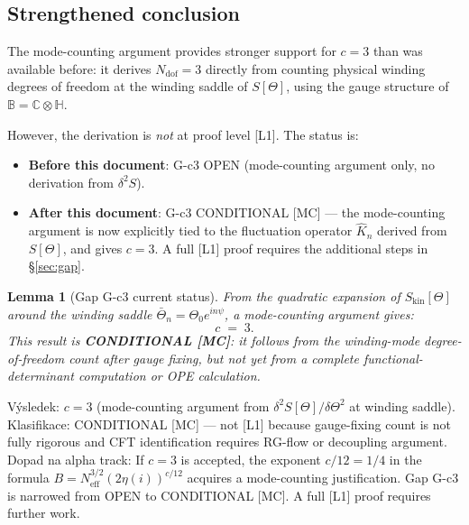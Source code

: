 \documentclass[12pt,a4paper]{article}
\newtheorem{lemma}[theorem]{Lemma}
\theoremstyle{remark}
\newcommand{\BB}{\mathbb{B}}
\newcommand{\CC}{\mathbb{C}}
\newcommand{\HH}{\mathbb{H}}
\begin{document}
\subsection{Strengthened conclusion}

The mode-counting argument provides stronger support for $c = 3$ than was
available before: it derives $N_{\mathrm{dof}} = 3$ directly from counting
physical winding degrees of freedom at the winding saddle of $S[\Theta]$,
using the gauge structure of $\BB = \CC\otimes\HH$.

However, the derivation is \emph{not} at proof level [L1].  The status is:
\begin{itemize}
  \item \textbf{Before this document}: G-c3 OPEN (mode-counting argument only,
        no derivation from $\delta^2 S$).
  \item \textbf{After this document}: G-c3 CONDITIONAL [MC] — the
        mode-counting argument is now explicitly tied to the fluctuation
        operator $\hat K_n$ derived from $S[\Theta]$, and gives $c = 3$.
        A full [L1] proof requires the additional steps in §\ref{sec:gap}.
\end{itemize}

\begin{lemma}[Gap G-c3 current status]
\label{lem:c3}
From the quadratic expansion of $S_{\mathrm{kin}}[\Theta]$ around the winding
saddle $\bar\Theta_n = \Theta_0 e^{in\psi}$, a mode-counting argument gives:
\begin{equation}
  c \;=\; 3.
\end{equation}
This result is \textbf{CONDITIONAL [MC]}: it follows from the winding-mode
degree-of-freedom count after gauge fixing, but not yet from a complete
functional-determinant computation or OPE calculation.
\end{lemma}

\begin{statusbox}
Výsledek: $c = 3$ (mode-counting argument from $\delta^2 S[\Theta]/\delta\Theta^2$
at winding saddle).\\
Klasifikace: CONDITIONAL [MC] — not [L1] because gauge-fixing count is
  not fully rigorous and CFT identification requires RG-flow or decoupling argument.\\
Dopad na alpha track: If $c = 3$ is accepted, the exponent $c/12 = 1/4$
  in the formula $B = N_{\mathrm{eff}}^{3/2}(2\eta(i))^{c/12}$ acquires
  a mode-counting justification.  Gap G-c3 is narrowed from OPEN to
  CONDITIONAL [MC].  A full [L1] proof requires further work.
\end{statusbox}

\ifdefined\INCLUDEMODE
\else
  
\end{document}
